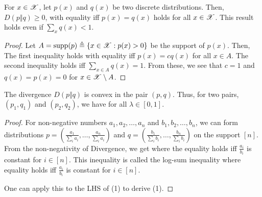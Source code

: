 \documentclass[letterpaper,10pt,english]{article}
\begin{document}
\begin{thm}
\label{thm:NonNegDiv}
For $x \in \mathscr{X}$, let $p(x)$ and $q(x)$ be two discrete distributions. 
Then, $D(p\Vert q) \ge 0$, with equality iff $p(x) = q(x)$ holds for all $x \in \mathscr{X}$. 
This result holds even if $\sum_x q(x) < 1$.
\end{thm}
\begin{proof}
Let $A = \text{supp}(p) \triangleq \left\{x \in \mathscr{X} : p(x) > 0\right\}$ be the support of $p(x)$. 
Then, 
The first inequality holds with equality iff $p(x) = cq(x)$ for all $x \in A$. 
The second inequality holds iff $\sum_{x \in A} q(x)=1$. 
From these, we see that 
$c=1$ and $q(x)=p(x)=0$ for $x \in \mathscr{X}\setminus A$.
\end{proof}
\begin{thm} 
The divergence $D (p\Vert q)$ is convex in the pair $(p, q)$.
Thus, for two pairs, $(p_1, q_1)$ and $(p_2, q_2)$, we have
for all $\lambda \in [0, 1]$.
\end{thm} 
\begin{proof} 
For non-negative numbers $a_1, a_2, \dots, a_n$ and $b_1, b_2, \dots, b_n$, 
we can form distributions $p = (\frac{a_1}{\sum_ia_i}, \dots, \frac{a_n}{\sum_ia_i})$ and $q = (\frac{b_1}{\sum_ib_i}, \dots, \frac{b_n}{\sum_ib_i})$ on the support $[n]$. 
From the non-negativity of Divergence, we get 
where the equality holds iff $\frac{a_i}{b_i}$ is constant for $i \in [n]$. 
This inequality is called the log-sum inequality
where equality holds iff $\frac{a_i}{b_i}$ is constant for $i \in [n]$. 

One can apply this to the LHS of (1) to derive (1).
\end{proof}
\end{document}
